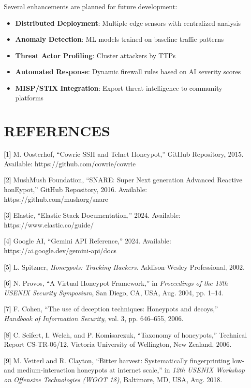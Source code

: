 \documentclass[12pt,a4paper]{report}
\begin{document}
Several enhancements are planned for future development:

\begin{itemize}
\item \textbf{Distributed Deployment}: Multiple edge sensors with centralized analysis
\item \textbf{Anomaly Detection}: ML models trained on baseline traffic patterns
\item \textbf{Threat Actor Profiling}: Cluster attackers by TTPs
\item \textbf{Automated Response}: Dynamic firewall rules based on AI severity scores
\item \textbf{MISP/STIX Integration}: Export threat intelligence to community platforms
\end{itemize}


\chapter*{REFERENCES}
\thispagestyle{mainpages}
\pagestyle{mainpages}

[1] M. Oosterhof, ``Cowrie SSH and Telnet Honeypot,'' GitHub Repository, 2015. Available: https://github.com/cowrie/cowrie

[2] MushMush Foundation, ``SNARE: Super Next generation Advanced Reactive honEypot,'' GitHub Repository, 2016. Available: https://github.com/mushorg/snare

[3] Elastic, ``Elastic Stack Documentation,'' 2024. Available: https://www.elastic.co/guide/

[4] Google AI, ``Gemini API Reference,'' 2024. Available: https://ai.google.dev/gemini-api/docs

[5] L. Spitzner, \textit{Honeypots: Tracking Hackers}. Addison-Wesley Professional, 2002.

[6] N. Provos, ``A Virtual Honeypot Framework,'' in \textit{Proceedings of the 13th USENIX Security Symposium}, San Diego, CA, USA, Aug. 2004, pp. 1--14.

[7] F. Cohen, ``The use of deception techniques: Honeypots and decoys,'' \textit{Handbook of Information Security}, vol. 3, pp. 646--655, 2006.

[8] C. Seifert, I. Welch, and P. Komisarczuk, ``Taxonomy of honeypots,'' Technical Report CS-TR-06/12, Victoria University of Wellington, New Zealand, 2006.

[9] M. Vetterl and R. Clayton, ``Bitter harvest: Systematically fingerprinting low- and medium-interaction honeypots at internet scale,'' in \textit{12th USENIX Workshop on Offensive Technologies (WOOT 18)}, Baltimore, MD, USA, Aug. 2018.
\end{document}
